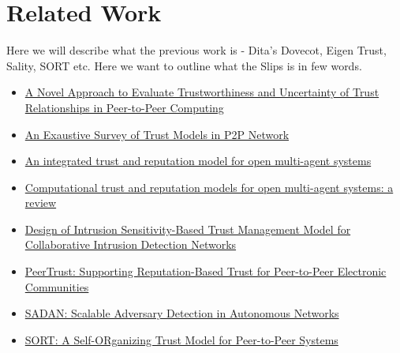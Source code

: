 \chapter{Related Work}
Here we will describe what the previous work is - Dita's Dovecot, Eigen Trust, Sality, SORT etc.
Here we want to outline what the Slips is in few words.

\begin{itemize}
    \item \href{https://share.goodnotes.com/s/60IVzs1mgmuPWF54Us5eKA}{A Novel Approach to Evaluate Trustworthiness and Uncertainty of Trust Relationships in Peer-to-Peer Computing} 
    \item \href{https://share.goodnotes.com/s/7AFjiqAqJSCF1en3vt4vjS}{An Exaustive Survey of Trust Models in P2P Network}
    \item \href{https://share.goodnotes.com/s/EziqqW185BzxHxNrZ6d1MQ}{An integrated trust and reputation model for open multi-agent systems}
    \item \href{https://share.goodnotes.com/s/MRfXxmu2Lz51IqK7JODn1N}{Computational trust and reputation models for open multi-agent systems: a review}
    \item \href{https://share.goodnotes.com/s/tafBG1KUZCuYT2E7a3ucc9}{Design of Intrusion Sensitivity-Based Trust Management Model for Collaborative Intrusion Detection Networks}
    \item \href{https://share.goodnotes.com/s/YQuoXUbYADa15Hwe90sXCM}{ PeerTrust: Supporting Reputation-Based Trust for Peer-to-Peer Electronic Communities}
    \item \href{https://share.goodnotes.com/s/hRHxSYlk6wU4BEn6u9Jcyu}{SADAN: Scalable Adversary Detection in Autonomous Networks}
    \item \href{https://share.goodnotes.com/s/bXWUbVFi5qBiAdBmJ4yYAx}{SORT: A Self-ORganizing Trust Model for Peer-to-Peer Systems}
\end{itemize}